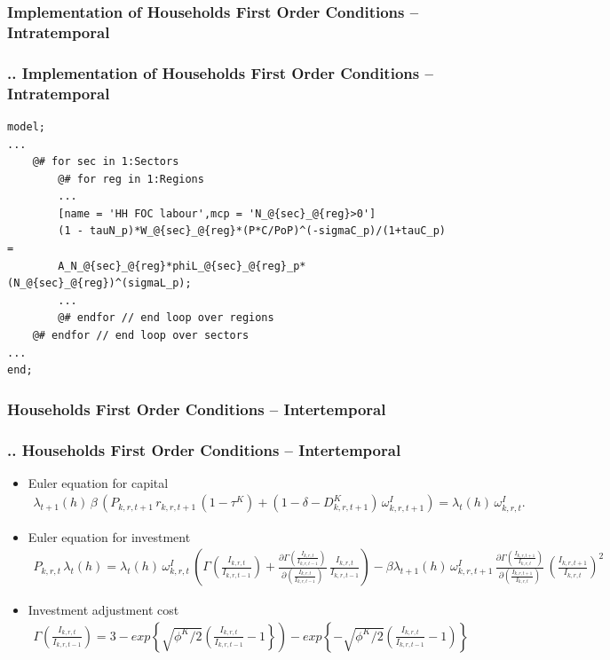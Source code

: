 \documentclass[11pt,aspectratio=169]{beamer}
\begin{document}
\subsubsection{Implementation of Households First Order Conditions -- Intratemporal}
\begin{frame}[fragile]
\frametitle{{\thesection.\thesubsection.\thesubsubsection} Implementation of Households First Order Conditions -- Intratemporal}

\begin{lstlisting}[frame = single]
model;
...
    @# for sec in 1:Sectors
        @# for reg in 1:Regions
        ...
        [name = 'HH FOC labour',mcp = 'N_@{sec}_@{reg}>0']
        (1 - tauN_p)*W_@{sec}_@{reg}*(P*C/PoP)^(-sigmaC_p)/(1+tauC_p) = 
        A_N_@{sec}_@{reg}*phiL_@{sec}_@{reg}_p*(N_@{sec}_@{reg})^(sigmaL_p);
        ...						
        @# endfor // end loop over regions
    @# endfor // end loop over sectors
...
end;
\end{lstlisting}
\end{frame}


\subsubsection{Households First Order Conditions -- Intertemporal}
\begin{frame}
\frametitle{{\thesection.\thesubsection.\thesubsubsection} Households First Order Conditions -- Intertemporal}
\scriptsize
\begin{itemize}
\item Euler equation for capital
\begin{align*}
\lambda_{t+1}(h) \, \beta \, \left(P_{k,r,t+1} \, r_{k,r,t+1} \, (1 - \tau^K)+(1 - \delta - D^{K}_{k,r,t+1}) \, \omega^{I}_{k,r,t+1} \right) = \lambda_{t}(h) \, \omega^{I}_{k,r,t}.
\end{align*}
\item Euler equation for investment
\begin{align*}
P_{k,r,t} \, \lambda_{t}(h) = \lambda_{t}(h) \, \omega^{I}_{k,r,t} \, \left(\Gamma(\frac{I_{k,r,t}}{I_{k,r,t-1}})+\frac{\partial \Gamma(\frac{I_{k,r,t}}{I_{k,r,t-1}})}{\partial (\frac{I_{k,r,t}}{I_{k,r,t-1}})} \, \frac{I_{k,r,t}}{I_{k,r,t-1}} \right) - \beta \lambda_{t+1}(h) \, \omega^{I}_{k,r,t+1} \, \frac{\partial \Gamma(\frac{I_{k,r,t+1}}{I_{k,r,t}})}{\partial (\frac{I_{k,r,t+1}}{I_{k,r,t}})} \, \left(\frac{I_{k,r,t+1}}{I_{k,r,t}}\right)^2
\end{align*}
\item Investment adjustment cost
\begin{align*}
\Gamma(\frac{I_{k,r,t}}{I_{k,r,t-1}}) = 3 - exp\left\lbrace\sqrt{\phi^{K}/2}\left(\frac{I_{k,r,t}}{I_{k,r,t-1}}-1\right\rbrace\right) - exp\left\lbrace-\sqrt{\phi^{K}/2}\left(\frac{I_{k,r,t}}{I_{k,r,t-1}}-1\right)\right\rbrace
\end{align*}
\end{itemize}
\end{frame}
\end{document}
